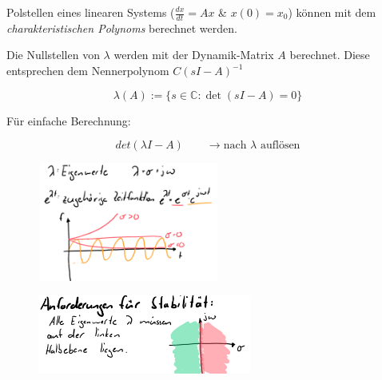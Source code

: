 \documentclass[
  10pt,
  a4paper,
  twocolumn]{article}
\numberwithin{equation}{section}
\begin{document}
Polstellen eines linearen Systems (\(\frac{dx}{dt}=Ax\) \& \(x(0)=x_0\))
können mit dem \emph{charakteristischen Polynoms} berechnet werden.

\begin{tcolorbox}[enhanced jigsaw, colframe=quarto-callout-important-color-frame, toptitle=1mm, title=\textcolor{quarto-callout-important-color}{\faExclamation}\hspace{0.5em}{charakteristisches Polynom}, bottomtitle=1mm, opacityback=0, left=2mm, opacitybacktitle=0.6, bottomrule=.15mm, leftrule=.75mm, coltitle=black, titlerule=0mm, colback=white, breakable, toprule=.15mm, colbacktitle=quarto-callout-important-color!10!white, rightrule=.15mm, arc=.35mm]

Die Nullstellen von \(\lambda\) werden mit der Dynamik-Matrix \(A\)
berechnet. Diese entsprechen dem Nennerpolynom \(C(sI-A)^{-1}\)

\[
\lambda(A) := \{s \in \mathbb{C} :  \det(sI-A)=0\}
\]

Für einfache Berechnung:

\[
det(\lambda I-A)\qquad\rightarrow\text{nach }\lambda\text{ auflösen}
\]

\begin{figure}[H]

{\centering \includegraphics[width=6cm,height=3.9cm]{images/paste-71.png}

}

\end{figure}

\begin{figure}[H]

{\centering \includegraphics[width=7cm,height=\textheight]{images/paste-72.png}

}

\end{figure}

\end{tcolorbox}
\end{document}
